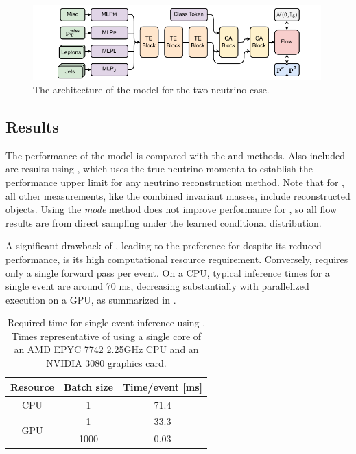 \begin{figure}[ht]
    \centering
    \includegraphics[width=0.99\textwidth]{Figures/neutrino_unfolding/nu2flow.pdf}
    \caption{The architecture of the \vvflows model for the two-neutrino case.}
    \label{fig:nunuflows}
\end{figure}

\subsection{Results}

The performance of the \vvflows model is compared with the \vweight and \ellipse methods.
Also included are results using \vtruth, which uses the true neutrino momenta to establish the performance upper limit for any neutrino reconstruction method.
Note that for \vtruth, all other measurements, like the combined invariant masses, include reconstructed objects.
Using the \textit{mode} method does not improve performance for \vvflows, so all flow results are from direct sampling under the learned conditional distribution.

A significant drawback of \vweight, leading to the preference for \ellipse despite its reduced performance, is its high computational resource requirement.
Conversely, \vflows requires only a single forward pass per event.
On a CPU, typical inference times for a single event are around 70 ms, decreasing substantially with parallelized execution on a GPU, as summarized in .

\begin{table}[htbp]
    \centering
    \caption{Required time for single event inference using \vvflows. Times representative of using a single core of an AMD EPYC 7742 2.25GHz CPU and an NVIDIA 3080 graphics card.}
    \label{tab:inf_times}
    \begin{tabular}{c c c}
        \toprule
        Resource             & Batch size & Time/event [ms] \\
        \midrule
        CPU                  & 1          & 71.4            \\
        \multirow{2}{*}{GPU} & 1          & 33.3            \\
                             & 1000       & 0.03            \\
        \bottomrule
    \end{tabular}
\end{table}

